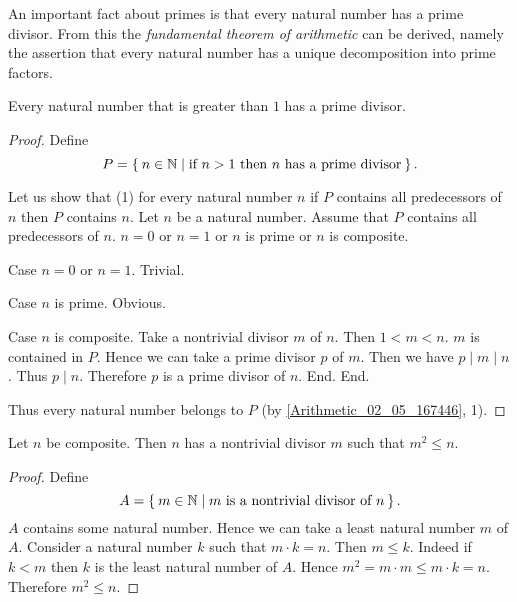 \documentclass[../../arithmetic.tex]{subfiles}
\begin{document}
  \noindent An important fact about primes is that every natural number has a
  prime divisor. From this the \textit{fundamental theorem of arithmetic}
  can be derived, namely the assertion that every natural number has a unique
  decomposition into prime factors.

  \begin{forthel}
    \begin{proposition}\label{Arithmetic_03_04_130748}
      Every natural number that is greater than $1$ has a prime divisor.
    \end{proposition}
    \begin{proof}
      Define \[ P = \Set{n \in \mathbb{N} | \text{if $n > 1$ then $n$ has a prime divisor}}. \]

      Let us show that (1) for every natural number $n$ if $P$ contains all predecessors of $n$ then $P$ contains $n$.
        Let $n$ be a natural number.
        Assume that $P$ contains all predecessors of $n$.
        $n = 0$ or $n = 1$ or $n$ is prime or $n$ is composite.

        Case $n = 0$ or $n = 1$. Trivial.

        Case $n$ is prime. Obvious.

        Case $n$ is composite.
          Take a nontrivial divisor $m$ of $n$.
          Then $1 < m < n$.
          $m$ is contained in $P$.
          Hence we can take a prime divisor $p$ of $m$.
          Then we have $p \mid m \mid n$.
          Thus $p \mid n$.
          Therefore $p$ is a prime divisor of $n$.
        End.
      End.

      Thus every natural number belongs to $P$ (by \ref{Arithmetic_02_05_167446}, 1).
    \end{proof}

    \begin{proposition}\label{Arithmetic_03_04_306779}
      Let $n$ be composite.
      Then $n$ has a nontrivial divisor $m$ such that $m^{2} \leq n$.
    \end{proposition}
    \begin{proof}
      Define \[ A = \Set{m \in \mathbb{N} | \text{$m$ is a nontrivial divisor of $n$}}. \]
      $A$ contains some natural number.
      Hence we can take a least natural number $m$ of $A$.
      Consider a natural number $k$ such that $m \cdot k = n$.
      Then $m \leq k$.
      Indeed if $k < m$ then $k$ is the least natural number of $A$.
      Hence $m^{2} = m \cdot m \leq m \cdot k = n$.
      Therefore $m^{2} \leq n$.
    \end{proof}
  \end{forthel}
\end{document}
